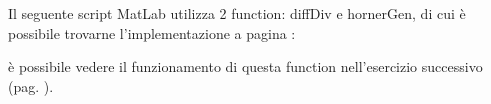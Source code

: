 \begin{flushleft}
Il seguente script MatLab utilizza 2 function: diffDiv e hornerGen, di cui è possibile trovarne l'implementazione a pagina \pageref{functcap4}:



è possibile vedere il funzionamento di questa function nell'esercizio successivo (pag. \pageref{es42}).
\end{flushleft}